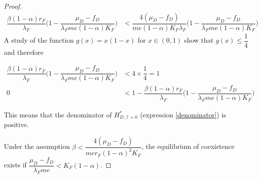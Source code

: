 \documentclass{article}
\newcommand{\lfw}{\lambda_{F}}
\newcommand{\lfw}{\lambda_{F}}
\newcommand{\cI}{\mathcal{I}}
\begin{document}
\begin{proof}
\begin{align*}
\dfrac{\beta (1-\alpha) r_F}{\lfw} \Big(1 - \dfrac{\mu_D - f_D}{\lfw m e(1-\alpha)K_F} \Big) &< \dfrac{4 (\mu_D - f_D)}{m e (1-\alpha) K_F \lfw}\Big(1 - \dfrac{\mu_D - f_D}{\lfw m e(1-\alpha)K_F} \Big)
\end{align*}
A study of the function $g(x) = x(1-x)$ for $x \in (0,1)$ show that $g(x) \leq \dfrac{1}{4}$ and therefore 

\begin{align*}
\dfrac{\beta (1-\alpha) r_F}{\lfw} \Big(1 - \dfrac{\mu_D - f_D}{\lfw m e(1-\alpha)K_F} \Big) &< 4 \times \dfrac{1}{4} = 1 \\
0 &< 1 - \dfrac{\beta (1-\alpha) r_F}{\lfw} \Big(1 - \dfrac{\mu_D - f_D}{\lfw m e(1-\alpha)K_F} \Big)
\end{align*}

This means that the denominator of $H^*_{D, \cI = 0}$ (expression \eqref{denominator}) is positive.

Under the assumption $ \beta < \dfrac{4 (\mu_D - f_D)}{m e r_F (1-\alpha)^2 K_F}$, the equilibrium of coexistence exists if $\dfrac{\mu_D - f_D}{\lfw m e} < K_F(1-\alpha)$.
\end{proof}
\end{document}
